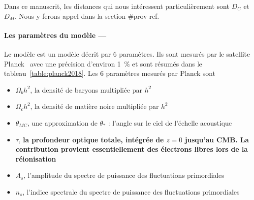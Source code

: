 \documentclass[11pt, twoside, a4paper, openright]{report}
\begin{document}
Dans ce manuscrit, les distances qui nous intéressent particulièrement sont $D_C$ et $D_M$. Nous y ferons appel dans la section \#prov ref.

\paragraph{Les paramètres du modèle —} 
Le modèle \lcdm{} est un modèle décrit par 6 paramètres. Ils sont mesurés par le satellite Planck~\cite{CITE ref} avec une précision d'environ 1~\% et sont résumés dans le tableau~\ref{table:planck2018}. Les 6 paramètres mesurés par Planck sont
\begin{itemize}
\item $\Omega_bh^2$, la densité de baryons multipliée par $h^2$
\item $\Omega_ch^2$, la densité de matière noire multipliée par $h^2$
\item $\theta_{MC}$, une approximation de $\theta_*$ : l'angle sur le ciel de l'échelle acoustique
\item $\tau$, \textbf{la profondeur optique totale, intégrée de $z=0$ jusqu'au CMB. La contribution provient essentiellement des électrons libres lors de la réionisation}
\item $A_s$, l'amplitude du spectre de puissance des fluctuations primordiales 
\item $n_s$, l'indice spectrale du spectre de puissance des fluctuations primordiales
\end{itemize}
\end{document}
